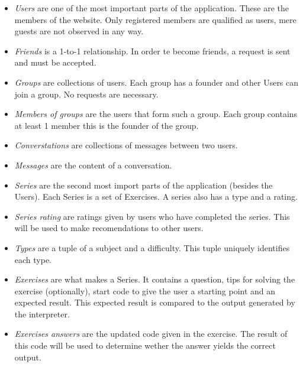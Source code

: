 \begin{itemize}
    \item \emph{Users} are one of the most important parts of the application. These are the members
        of the website. Only registered members are qualified as users, mere guests are not observed
        in any way.
    \item \emph{Friends} is a 1-to-1 relationship. In order te become friends, a request is sent and
        must be accepted.
    \item \emph{Groups} are collections of users. Each group has a founder and other Users can join 
        a group. No requests are necessary.
    \item \emph{Members of groups} are the users that form such a group. Each group contains at least 1 member
        this is the founder of the group.
    \item \emph{Converstations} are collections of messages between two users.
    \item \emph{Messages} are the content of a conversation.
    \item \emph{Series} are the second most import parts of the application (besides the Users). Each Series
        is a set of Exercises. A series also has a type and a rating.
    \item \emph{Series rating} are ratings given by users who have completed the series. This will
        be used to make recomendations to other users.
    \item \emph{Types} are a tuple of a subject and a difficulty. This tuple uniquely identifies each type.
    \item \emph{Exercises} are what makes a Series. It contains a question, tips for solving
        the exercise (optionally), start code to give the user a starting point and an expected result.
        This expected result is compared to the output generated by the interpreter.
    \item \emph{Exercises answers} are the updated code given in the exercise. The result of this code
        will be used to determine wether the answer yields the correct output.
\end{itemize}

